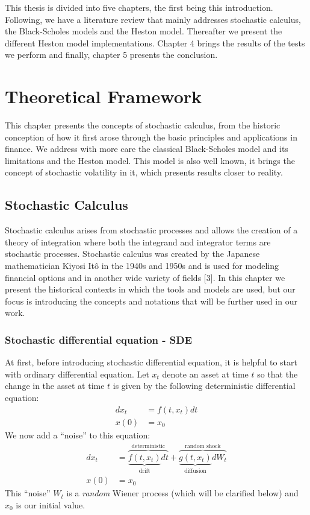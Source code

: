\documentclass[12pt,twoside]{reedthesis}
\theoremstyle{definition}
\theoremstyle{definition}
\theoremstyle{remark}
\begin{document}
  This thesis is divided into five chapters, the first being this
  introduction. Following, we have a literature review that mainly
  addresses stochastic calculus, the Black-Scholes models and the Heston
  model. Thereafter we present the different Heston model implementations.
  Chapter 4 brings the results of the tests we perform and finally,
  chapter 5 presents the conclusion.
  
  \chapter{Theoretical Framework}\label{lt-review}
  
  This chapter presents the concepts of stochastic calculus, from the
  historic conception of how it first arose through the basic principles
  and applications in finance. We address with more care the classical
  Black-Scholes model and its limitations and the Heston model. This model
  is also well known, it brings the concept of stochastic volatility in
  it, which presents results closer to reality.
  
  \section{Stochastic Calculus}\label{stochastic-calculus}
  
  Stochastic calculus arises from stochastic processes and allows the
  creation of a theory of integration where both the integrand and
  integrator terms are stochastic processes. Stochastic calculus was
  created by the Japanese mathematician Kiyosi Itô in the 1940s and 1950s
  and is used for modeling financial options and in another wide variety
  of fields {[}3{]}. In this chapter we present the historical contexts in
  which the tools and models are used, but our focus is introducing the
  concepts and notations that will be further used in our work.
  
  \subsection{Stochastic differential equation -
  SDE}\label{stochastic-differential-equation---sde}
  
  At first, before introducing stochastic differential equation, it is
  helpful to start with ordinary differential equation. Let \(x_t\) denote
  an asset at time \(t\) so that the change in the asset at time \(t\) is
  given by the following deterministic differential equation:
  \begin{align}
  dx_t &= f(t, x_t)dt \\
  x(0) &= x_0 \nonumber
  \end{align}
  We now add a ``noise'' to this equation:
  \begin{align} \label{eq:sde1}
  dx_t &= \overbrace{\underbrace{f(t, x_t)}_\text{drift}dt}^\text{deterministic} + \overbrace{\underbrace{g(t, x_t)}_\text{diffusion}dW_t}^\text{random shock} \\
  x(0) &= x_0 \nonumber
  \end{align}
  This ``noise'' \(W_t\) is a \emph{random} Wiener process (which will be
  clarified below) and \(x_0\) is our initial value.
  
\end{document}
